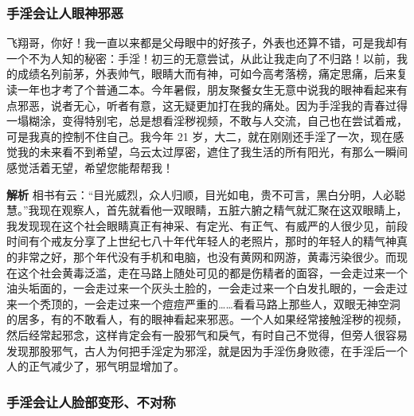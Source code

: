 \subsubsection{手淫会让人眼神邪恶}

\begin{case}
    飞翔哥，你好！我一直以来都是父母眼中的好孩子，外表也还算不错，可是我却有一个不为人知的秘密：手淫！初三的无意尝试，从此让我走向了不归路！以前，我的成绩名列前茅，外表帅气，眼睛大而有神，可如今高考落榜，痛定思痛，后来复读一年也才考了个普通二本。今年暑假，朋友聚餐女生无意中说我的眼神看起来有点邪恶，说者无心，听者有意，这无疑更加打在我的痛处。因为手淫我的青春过得一塌糊涂，变得特别宅，总是想看淫秽视频，不敢与人交流，自己也在尝试着戒，可是我真的控制不住自己。我今年 21 岁，大二，就在刚刚还手淫了一次，现在感觉我的未来看不到希望，乌云太过厚密，遮住了我生活的所有阳光，有那么一瞬间感觉活着无望，希望您能帮帮我！

    \textbf{解析} 相书有云：“目光威烈，众人归顺，目光如电，贵不可言，黑白分明，人必聪慧。”我现在观察人，首先就看他一双眼睛，五脏六腑之精气就汇聚在这双眼睛上，我发现现在这个社会眼睛真正有神采、有定光、有正气、有威严的人很少见，前段时间有个戒友分享了上世纪七八十年代年轻人的老照片，那时的年轻人的精气神真的非常之好，那个年代没有手机和电脑，也没有黄网和网游，黄毒污染很少。而现在这个社会黄毒泛滥，走在马路上随处可见的都是伤精者的面容，一会走过来一个油头垢面的，一会走过来一个灰头土脸的，一会走过来一个白发扎眼的，一会走过来一个秃顶的，一会走过来一个痘痘严重的……看看马路上那些人，双眼无神空洞的居多，有的不敢看人，有的眼神看起来邪恶。一个人如果经常接触淫秽的视频，然后经常起邪念，这样肯定会有一股邪气和戾气，有时自己不觉得，但旁人很容易发现那股邪气，古人为何把手淫定为邪淫，就是因为手淫伤身败德，在手淫后一个人的正气减少了，邪气明显增加了。
\end{case}

\subsubsection{手淫会让人脸部变形、不对称}

